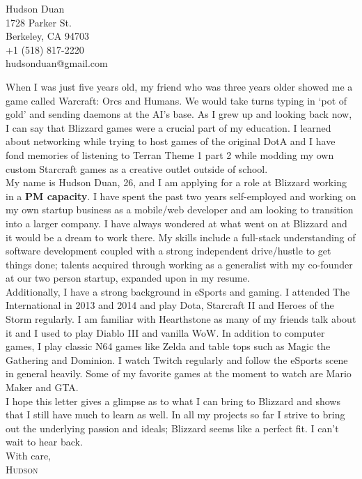 \documentclass[11pt, letterpaper, UTF-8]{article}
\begin{document}
\begin{flushright}
Hudson Duan\\
1728 Parker St.\\
Berkeley, CA 94703\\
+1 (518) 817-2220\\
hudsonduan@gmail.com\\
\end{flushright}
\bigskip
\hspace{4ex}When I was just five years old, my friend who was three years older showed me a game called Warcraft: Orcs and Humans. We would take turns typing in `pot of gold' and sending daemons at the AI's base. As I grew up and looking back now, I can say that Blizzard games were a crucial part of my education. I learned about networking while trying to host games of the original DotA and I have fond memories of listening to Terran Theme 1 part 2 while modding my own custom Starcraft games as a creative outlet outside of school.\\ 

My name is Hudson Duan, 26, and I am applying for a role at Blizzard working in a \textbf{PM capacity}. I have spent the past two years self-employed and working on my own startup business as a mobile/web developer and am looking to transition into a larger company. I have always wondered at what went on at Blizzard and it would be a dream to work there. My skills include a full-stack understanding of software development coupled with a strong independent drive/hustle to get things done; talents acquired through working as a generalist with my co-founder at our two person startup, expanded upon in my resume.\\

Additionally, I have a strong background in eSports and gaming. I attended The International in 2013 and 2014 and play Dota, Starcraft II and Heroes of the Storm regularly. I am familiar with Hearthstone as many of my friends talk about it and I used to play Diablo III and vanilla WoW. In addition to computer games, I play classic N64 games like Zelda and table tops such as Magic the Gathering and Dominion. I watch Twitch regularly and follow the eSports scene in general heavily. Some of my favorite games at the moment to watch are Mario Maker and GTA.\\

I hope this letter gives a glimpse as to what I can bring to Blizzard and shows that I still have much to learn as well. In all my projects so far I strive to bring out the underlying passion and ideals; Blizzard seems like a perfect fit. I can't wait to hear back.\\

\bigskip\bigskip
\noindent With care,\\

\bigskip
\noindent 
\textsc{Hudson}\\
\end{document}
